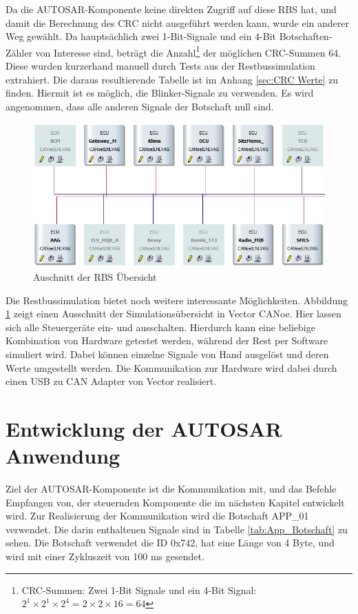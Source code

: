 \documentclass[
  a4paper,					    %
  twoside,
  DIV=calc,     				%
  bibliography=totoc,
  cleardoublepage=empty,
  ngerman,     					%
  final       					%
]{scrbook}
\begin{document}
Da die AUTOSAR-Komponente keine direkten Zugriff auf diese RBS hat, und damit die Berechnung des CRC nicht ausgeführt werden kann, wurde ein anderer Weg gewählt. Da hauptsächlich zwei 1-Bit-Signale und ein 4-Bit Botschaften-Zähler von Interesse sind, beträgt die Anzahl\footnote{CRC-Summen: Zwei 1-Bit Signale und ein 4-Bit Signal: $ 2^1 \times 2^1 \times 2^4 = 2 \times 2 \times 16 = 64 $} der möglichen CRC-Summen 64. Diese wurden kurzerhand manuell durch Tests aus der Restbussimulation extrahiert. Die daraus resultierende Tabelle ist im Anhang \ref{sec:CRC Werte} zu finden. Hiermit ist es möglich, die Blinker-Signale zu verwenden. Es wird angenommen, dass alle anderen Signale der Botschaft null sind.

\begin{figure}[ht]
    \centering
    \includegraphics[width=\textwidth]{rbs_ausschnitt}
    \caption{Auschnitt der RBS Übersicht}
    \label{fig:rbs}
\end{figure}

Die Restbussimulation bietet noch weitere interessante Möglichkeiten. Abbildung \ref{fig:rbs} zeigt einen Ausschnitt der Simulationsübersicht in Vector CANoe. Hier lassen sich alle Steuergeräte ein- und ausschalten. Hierdurch kann eine beliebige Kombination von Hardware getestet werden, während der Rest per Software simuliert wird. Dabei können einzelne Signale von Hand ausgelöst und deren Werte umgestellt werden. Die Kommunikation zur Hardware wird dabei durch einen USB zu CAN Adapter von Vector realisiert.










\section{Entwicklung der AUTOSAR Anwendung}
\label{sec:entwicklung_autosar}
Ziel der AUTOSAR-Komponente ist die Kommunikation mit, und das Befehle Empfangen von, der steuernden Komponente die im nächsten Kapitel entwickelt wird. Zur Realisierung der Kommunikation wird die Botschaft APP\_01 verwendet. Die darin enthaltenen Signale sind in Tabelle \ref{tab:App_Botschaft} zu sehen. Die Botschaft verwendet die ID 0x742, hat eine Länge von 4 Byte, und wird mit einer Zykluszeit von 100 ms gesendet.
\end{document}
